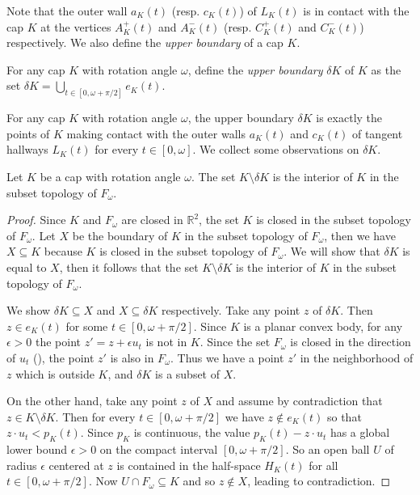 Note that the outer wall \(a_K(t)\) (resp. \(c_K(t)\)) of \(L_K(t)\) is in contact with the cap \(K\) at the vertices \(A_K^+(t)\) and \(A_K^-(t)\) (resp. \(C_K^+(t)\) and \(C_K^-(t)\)) respectively. We also define the \emph{upper boundary} of a cap \(K\).

\begin{definition}

For any cap \(K\) with rotation angle \(\omega\), define the \emph{upper boundary} \(\delta K\) of \(K\) as the set \(\delta K = \bigcup_{t \in [0, \omega + \pi/2]} e_K(t)\).

\label{def:upper-boundary-of-cap}
\end{definition}

For any cap \(K\) with rotation angle \(\omega\), the upper boundary \(\delta K\) is exactly the points of \(K\) making contact with the outer walls \(a_K(t)\) and \(c_K(t)\) of tangent hallways \(L_K(t)\) for every \(t \in [0, \omega]\). We collect some observations on \(\delta K\).

\begin{proposition}

Let \(K\) be a cap with rotation angle \(\omega\). The set \(K \setminus \delta K\) is the interior of \(K\) in the subset topology of \(F_\omega\).

\label{pro:upper-boundary-interior}
\end{proposition}

\begin{proof}
Since \(K\) and \(F_\omega\) are closed in \(\mathbb{R}^2\), the set \(K\) is closed in the subset topology of \(F_\omega\). Let \(X\) be the boundary of \(K\) in the subset topology of \(F_\omega\), then we have \(X \subseteq K\) because \(K\) is closed in the subset topology of \(F_\omega\). We will show that \(\delta K\) is equal to \(X\), then it follows that the set \(K \setminus \delta K\) is the interior of \(K\) in the subset topology of \(F_\omega\).

We show \(\delta K \subseteq X\) and \(X \subseteq \delta K\) respectively. Take any point \(z\) of \(\delta K\). Then \(z \in e_K(t)\) for some \(t \in [0, \omega + \pi/2]\). Since \(K\) is a planar convex body, for any \(\epsilon > 0\) the point \(z' = z + \epsilon u_t\) is not in \(K\). Since the set \(F_\omega\) is closed in the direction of \(u_t\) (), the point \(z'\) is also in \(F_\omega\). Thus we have a point \(z'\) in the neighborhood of \(z\) which is outside \(K\), and \(\delta K\) is a subset of \(X\).

On the other hand, take any point \(z\) of \(X\) and assume by contradiction that \(z \in K \setminus \delta K\). Then for every \(t \in [0, \omega + \pi/2]\) we have \(z \not \in e_K(t)\) so that \(z \cdot u_t < p_K(t)\). Since \(p_K\) is continuous, the value \(p_K(t) - z \cdot u_t\) has a global lower bound \(\epsilon > 0\) on the compact interval \([0, \omega + \pi/2]\). So an open ball \(U\) of radius \(\epsilon\) centered at \(z\) is contained in the half-space \(H_K(t)\) for all \(t \in [0, \omega + \pi/2]\). Now \(U \cap F_\omega \subseteq K\) and so \(z \not\in X\), leading to contradiction.
\end{proof}

